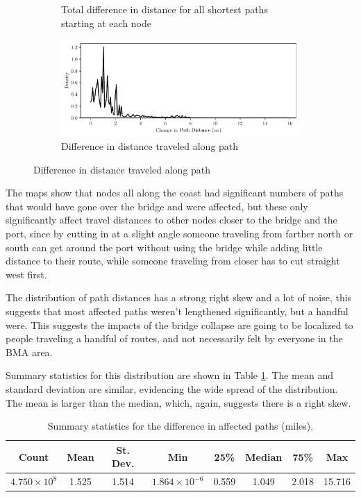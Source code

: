 \documentclass[11pt]{article}
\numberwithin{equation}{section} %
\numberwithin{figure}{section} %
\numberwithin{table}{section} %
\theoremstyle{definition}
\begin{document}
\begin{figure}[t!]
\begin{subfigure}{0.49\textwidth}
    \caption{Total difference in distance for all shortest paths starting at each node}
  \end{subfigure}
  \begin{subfigure}{\textwidth}
    \centering
    \includegraphics[width=\textwidth]{graphs/path_dists.pdf}
    \caption{Difference in distance traveled along path}
  \end{subfigure}

  \label{fig:spaths}
\end{figure}

The maps show that nodes all along the coast had significant numbers of paths that would have gone over the bridge and were affected, but these only significantly affect travel distances to other nodes closer to the bridge and the port, since by cutting in at a slight angle someone traveling from farther north or south can get around the port without using the bridge while adding little distance to their route, while someone traveling from closer has to cut straight west first.

The distribution of path distances has a strong right skew and a lot of noise, this suggests that most affected paths weren't lengthened significantly, but a handful were. This suggests the impacts of the bridge collapse are going to be localized to people traveling a handful of routes, and not necessarily felt by everyone in the BMA area.

Summary statistics for this distribution are shown in Table \ref{tab:spaths}. The mean and standard deviation are similar, evidencing the wide spread of the distribution. The mean is larger than the median, which, again, suggests there is a right skew.

\begin{table}
  \caption{Summary statistics for the difference in affected paths (miles).}
  \centering
  \begin{tabular}{cccccccc}
    \toprule
    \textbf{Count} & \textbf{Mean}& \textbf{St. Dev.} & \textbf{Min} & \textbf{25\%} & \textbf{Median} & \textbf{75\%} & \textbf{Max} \\
    \midrule
    $4.750 \times 10^8$ & 1.525 & 1.514 & $1.864 \times 10^{-6}$ & 0.559 & 1.049 & 2.018 & 15.716 \\
    \bottomrule
  \end{tabular}
  \label{tab:spaths}
\end{table}
\end{document}
